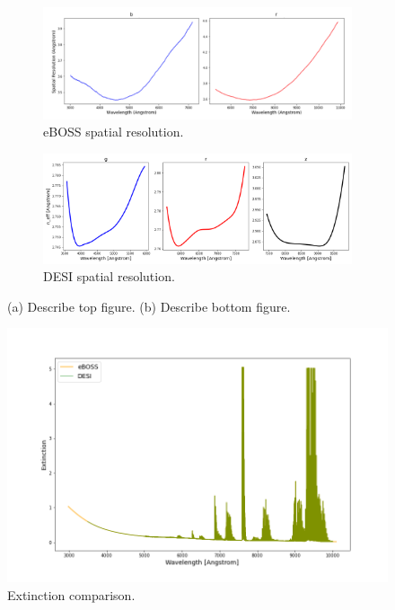 \begin{figure}[h]
\centering
\begin{subfigure}[b]{0.55\textwidth}
   \includegraphics[width=14cm]{images/specsim/eboss_neff.png}
   \caption{eBOSS spatial resolution.}
   \label{fig:eboss_neff} 
\end{subfigure}

\begin{subfigure}[b]{0.55\textwidth}
   \includegraphics[width=14cm]{images/specsim/desi_neff.png}
   \caption{DESI spatial resolution.}
   \label{fig:desi_neff}
\end{subfigure}
\caption[Two numerical solutions]{(a) Describe top figure. (b) Describe bottom figure.}
\end{figure}

\begin{figure}[h]
\centering
\includegraphics[width=12cm]{images/specsim/extinction.png}
\caption{Extinction comparison.}
\label{fig:extinction}
\end{figure}

